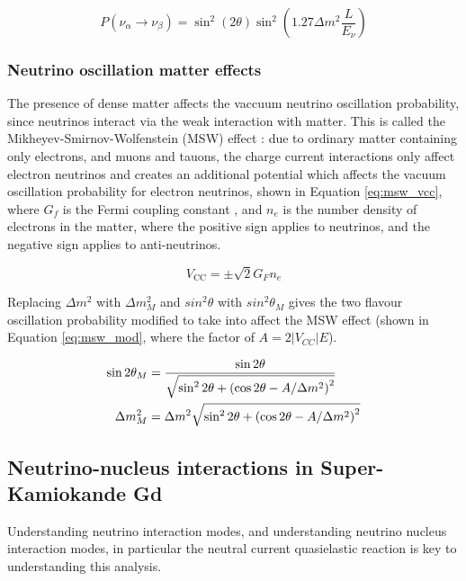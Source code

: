 \begin{equation}
P\left(\nu_{\alpha} \rightarrow \nu_{\beta}\right)=\sin ^{2}(2 \theta) \sin ^{2}\left(1.27 \Delta m^{2} \frac{L}{E_{\nu}}\right)
\label{eq:two_flavour_osc_prob}
\end{equation}

\subsubsection{Neutrino oscillation matter effects}

The presence of dense matter affects the vaccuum neutrino oscillation probability, since neutrinos interact via the weak interaction with matter. This is called the Mikheyev-Smirnov-Wolfenstein (MSW) effect \cite{Smirnov_2005}: due to ordinary matter containing only electrons, and muons and tauons, the charge current interactions only affect electron neutrinos and creates an additional potential which affects the vacuum oscillation probability for electron neutrinos, shown in Equation \ref{eq:msw_vcc}, where $G_{f}$ is the Fermi coupling constant \cite{van2000precise}, and $n_{e}$ is the number density of electrons in the matter, where the positive sign applies to neutrinos, and the negative sign applies to anti-neutrinos. 

\begin{equation}
    V_{\mathrm{CC}}=\pm \sqrt{2} G_{F} n_{e}
\label{eq:msw_vcc}
\end{equation}

Replacing $\Delta m^{2}$ with $\Delta m^{2}_{M}$ and $sin^{2}\theta$ with $sin^{2}\theta_{M}$ gives the two flavour oscillation probability modified to take into affect the MSW effect (shown in Equation \ref{eq:msw_mod}, where the factor of $A = 2|V_{CC}|E$).


\begin{align}
\sin 2 \theta_{M} &=\frac{\sin 2 \theta}{\sqrt{\sin ^{2} 2 \theta+\left(\cos 2 \theta-A / \Delta m^{2}\right)^{2}}} \label{eq:msw_mod}\\
\Delta m_{M}^{2} &=\Delta m^{2} \sqrt{\sin ^{2} 2 \theta+\left(\cos 2 \theta-A / \Delta m^{2}\right)^{2}} \notag
\end{align}



\subsection{Neutrino-nucleus interactions in Super-Kamiokande Gd}
Understanding neutrino interaction modes, and understanding neutrino nucleus interaction modes, in particular the neutral current quasielastic reaction is key to understanding this analysis. 

